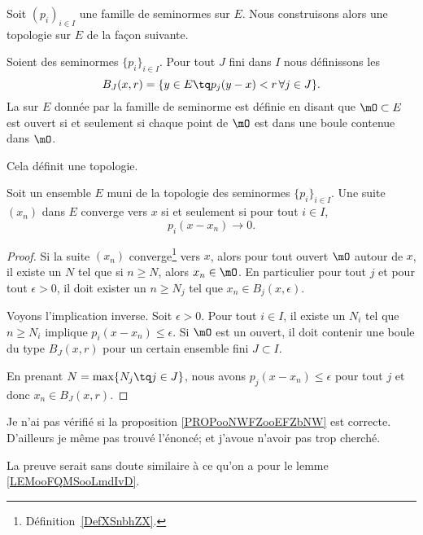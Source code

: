 Soit \( (p_i)_{i\in I}\) une famille de seminormes sur \( E\). Nous construisons alors une topologie sur \( E\) de la façon suivante.

\begin{propositionDef}      \label{DEFooZTKAooWYUyDa}
	Soient des seminormes \( \{ p_i \}_{i\in I}\). Pour tout \( J\) fini dans \( I\) nous définissons les 
	\begin{equation}
		B_J(x,r)=\{ y\in E\tq p_j(y-x)<r\,\forall j\in J \}.
	\end{equation}
	La  sur \( E\) donnée par la famille de seminorme est définie en disant que \( \mO\subset E\) est ouvert si et seulement si chaque point de \( \mO\) est dans une boule contenue dans \( \mO\).

	Cela définit une topologie.
\end{propositionDef}

\begin{proposition} \label{PropQPzGKVk}
	Soit un ensemble \( E\) muni de la topologie des seminormes \( \{ p_i \}_{i\in I}\). Une suite \( (x_n)\) dans \( E\) converge vers \( x\) si et seulement si pour tout \( i\in I\),
	\begin{equation}
		p_i(x-x_n)\to 0.
	\end{equation}
\end{proposition}

\begin{proof}
	Si la suite \( (x_n)\) converge\footnote{Définition~\ref{DefXSnbhZX}.} vers \( x\), alors pour tout ouvert \( \mO\) autour de \( x\), il existe un \( N\) tel que si \( n\geq N\), alors \( x_n\in\mO\). En particulier pour tout \( j\) et pour tout \( \epsilon>0\), il doit exister un \( n\geq N_j\) tel que \( x_n\in B_j(x,\epsilon)\).

	Voyons l'implication inverse. Soit \( \epsilon>0\). Pour tout \( i\in I\), il existe un \( N_i\) tel que \( n\geq N_i\) implique \( p_i(x-x_n)\leq \epsilon\). Si \( \mO\) est un ouvert, il doit contenir une boule du type \( B_J(x,r)\) pour un certain ensemble fini \( J\subset I\).

	En prenant \( N=\max\{ N_j\tq j\in J \}\), nous avons \( p_j(x-x_n)\leq \epsilon\) pour tout \( j\) et donc \( x_n\in B_J(x,r)\).
\end{proof}

\begin{probleme}        %
	Je n'ai pas vérifié si la proposition \ref{PROPooNWFZooEFZbNW} est correcte. D'ailleurs je même pas trouvé l'énoncé; et j'avoue n'avoir pas trop cherché.

	La preuve serait sans doute similaire à ce qu'on a pour le lemme \ref{LEMooFQMSooLmdIvD}.
\end{probleme}

